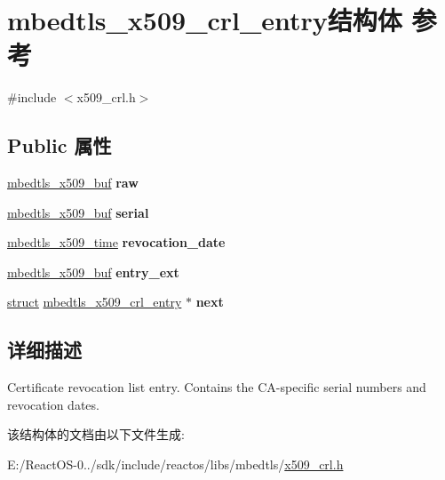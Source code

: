\hypertarget{structmbedtls__x509__crl__entry}{}\section{mbedtls\+\_\+x509\+\_\+crl\+\_\+entry结构体 参考}
\label{structmbedtls__x509__crl__entry}


{\ttfamily \#include $<$x509\+\_\+crl.\+h$>$}

\subsection*{Public 属性}
\begin{DoxyCompactItemize}
\item 
\mbox{\label{structmbedtls__x509__crl__entry_aa629ec226c2e624eb1bf72f4d5c2cc8d}} 
\hyperlink{group__x509__module_ga4d02c9e8e4e2934555e0d132cd2976dc}{mbedtls\+\_\+x509\+\_\+buf} {\bfseries raw}
\item 
\mbox{\label{structmbedtls__x509__crl__entry_a2cbc8acba11f2040948532389218741d}} 
\hyperlink{group__x509__module_ga4d02c9e8e4e2934555e0d132cd2976dc}{mbedtls\+\_\+x509\+\_\+buf} {\bfseries serial}
\item 
\mbox{\label{structmbedtls__x509__crl__entry_abb22e83d676a60bfd93bb6e3960daa3e}} 
\hyperlink{structmbedtls__x509__time}{mbedtls\+\_\+x509\+\_\+time} {\bfseries revocation\+\_\+date}
\item 
\mbox{\label{structmbedtls__x509__crl__entry_a5803a38521d5dbfd7240b364bde540a5}} 
\hyperlink{group__x509__module_ga4d02c9e8e4e2934555e0d132cd2976dc}{mbedtls\+\_\+x509\+\_\+buf} {\bfseries entry\+\_\+ext}
\item 
\mbox{\label{structmbedtls__x509__crl__entry_abb908815d7bcf91ff87992682efe33b0}} 
\hyperlink{interfacestruct}{struct} \hyperlink{structmbedtls__x509__crl__entry}{mbedtls\+\_\+x509\+\_\+crl\+\_\+entry} $\ast$ {\bfseries next}
\end{DoxyCompactItemize}


\subsection{详细描述}
Certificate revocation list entry. Contains the C\+A-\/specific serial numbers and revocation dates. 

该结构体的文档由以下文件生成\+:\begin{DoxyCompactItemize}
\item 
E\+:/\+React\+O\+S-\/0../sdk/include/reactos/libs/mbedtls/\hyperlink{x509__crl_8h}{x509\+\_\+crl.\+h}\end{DoxyCompactItemize}
